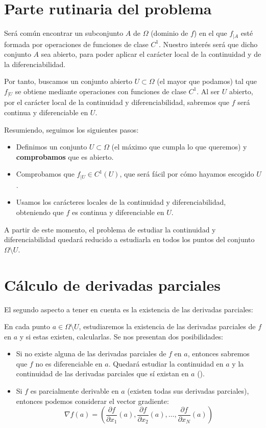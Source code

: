 \section{Parte rutinaria del problema}
\noindent
Será común encontrar un subconjunto $A$ de $\Omega$ (dominio de $f$) en el que $f_{|A}$ esté formada por operaciones de funciones de clase $C^1$. Nuestro interés será que dicho conjunto $A$ sea abierto, para poder aplicar el carácter local de la continuidad y de la diferenciabilidad.
\vspace{.5cm}

\noindent
Por tanto, buscamos un conjunto abierto $U \subset \Omega$ (el mayor que podamos) tal que $f_{|U}$ se obtiene mediante operaciones con funciones de clase $C^1$. Al ser $U$ abierto, por el carácter local de la continuidad y diferenciabilidad, sabremos que $f$ será continua y diferenciable en $U$.
\vspace{.5cm}

\noindent
Resumiendo, seguimos los siguientes pasos:
\begin{itemize}
    \item Definimos un conjunto $U \subset \Omega$ (el máximo que cumpla lo que queremos) y \textbf{comprobamos} que es abierto.
    \item Comprobamos que $f_{|U} \in C^1(U)$, que será fácil por cómo hayamos escogido $U$.
    \item Usamos los carácteres locales de la continuidad y diferenciabilidad, obteniendo que $f$ es continua y diferenciable en $U$.
\end{itemize}

\noindent
A partir de este momento, el problema de estudiar la continuidad y diferenciabilidad quedará reducido a estudiarla en todos los puntos del conjunto $\Omega \setminus U$.

\section{Cálculo de derivadas parciales}
\noindent
El segundo aspecto a tener en cuenta es la existencia de las derivadas parciales:
\vspace{.5cm}

\noindent
En cada punto $a \in \Omega \setminus U$, estudiaremos la existencia de las derivadas parciales de $f$ en $a$ y si estas existen, calcularlas. Se nos presentan dos posibilidades:

\begin{itemize}
    \item Si no existe alguna de las derivadas parciales de $f$ en $a$, entonces sabremos que $f$ no es diferenciable en $a$. Quedará estudiar la continuidad en $a$ y la continuidad de las derivadas parciales que sí existan en $a$ ().
    \item Si $f$ es parcialmente derivable en $a$ (existen todas sus derivadas parciales), entonces podemos considerar el vector gradiente:
    $$\nabla f(a) = \left( \dfrac{\partial f}{\partial x_1}(a), \dfrac{\partial f}{\partial x_2}(a), \ldots, \dfrac{\partial f}{\partial x_N}(a) \right)$$
\end{itemize}

